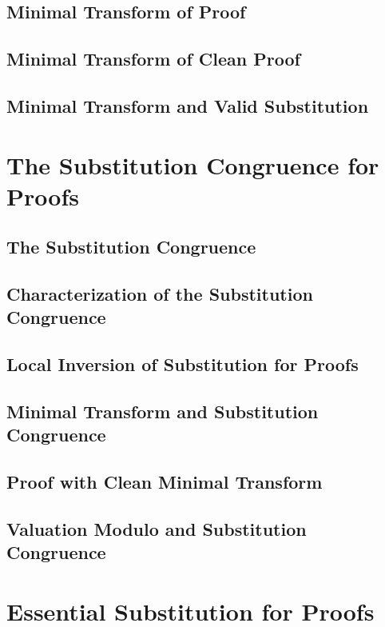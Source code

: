 \documentclass{report}
\begin{document}
    \subsection{Minimal Transform of Proof}
      
    \subsection{Minimal Transform of Clean Proof}
      
    \subsection{Minimal Transform and Valid Substitution}
      
\section{The Substitution Congruence for Proofs}
    \subsection{The Substitution Congruence}
      
    \subsection{Characterization of the Substitution Congruence}
      
    \subsection{Local Inversion of Substitution for Proofs}
      
    \subsection{Minimal Transform and Substitution Congruence}
      
    \subsection{Proof with Clean Minimal Transform}
      
    \subsection{Valuation Modulo and Substitution Congruence}
      
\section{Essential Substitution for Proofs}
\end{document}
